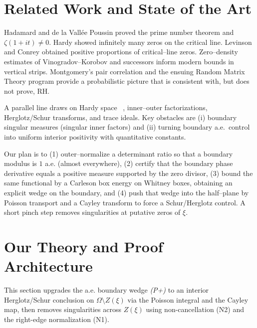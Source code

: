 \documentclass[11pt]{article}
\theoremstyle{definition}
\theoremstyle{remark}
\begin{document}
\vspace{1.0cm}
\section{Related Work and State of the Art}
\label{sec:soa}
Hadamard and de la Vallée Poussin proved the prime number theorem and $\zeta(1+it)\neq 0$.
Hardy showed infinitely many zeros on the critical line.
Levinson and Conrey obtained positive proportions of critical--line zeros.
Zero--density estimates of Vinogradov--Korobov and successors inform modern bounds in vertical strips.
Montgomery's pair correlation and the ensuing Random Matrix Theory program provide a probabilistic picture
that is consistent with, but does not prove, RH.


A parallel line draws on Hardy space ~\cite{DurenHp,Hoffman}, inner--outer factorizations,
Herglotz/Schur transforms, and trace ideals.
Key obstacles are (i) boundary singular measures (singular inner factors) and (ii) turning
boundary a.e.\ control into uniform interior positivity with quantitative constants.

Our plan is to
(1) outer--normalize a determinant ratio so that a boundary modulus is $1$ a.e. (almost everywhere),
(2) certify that the boundary phase derivative equals a positive measure supported by the zero divisor,
(3) bound the same functional by a Carleson box energy on Whitney boxes, obtaining an explicit wedge on the boundary, and
(4) push that wedge into the half--plane by Poisson transport and a Cayley transform to force a Schur/Herglotz control.
A short pinch step removes singularities at putative zeros of $\xi$.






\vspace{1.0cm}
\section{Our Theory and Proof Architecture}
\label{sec:theory} %
\noindent This section upgrades the a.e. boundary wedge \emph{(P+)} to an interior Herglotz/Schur conclusion
on $\Omega\setminus Z(\xi)$ via the Poisson integral and the Cayley map, then removes singularities
across $Z(\xi)$ using non-cancellation \textnormal{(N2)} and the right-edge normalization \textnormal{(N1)}.
\end{document}
